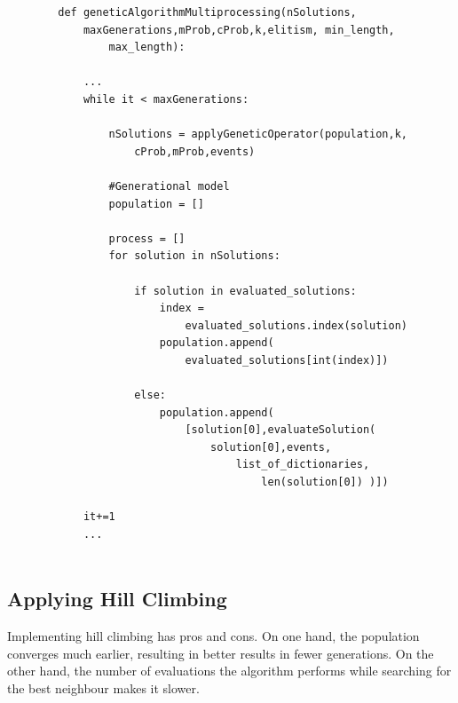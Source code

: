 \documentclass{article}
\begin{document}
        \begin{lstlisting}
        def geneticAlgorithmMultiprocessing(nSolutions,
            maxGenerations,mProb,cProb,k,elitism, min_length, 
                max_length):
    
            ...
            while it < maxGenerations:
    
                nSolutions = applyGeneticOperator(population,k,
                    cProb,mProb,events)
    
                #Generational model
                population = []
    
                process = []
                for solution in nSolutions:
                
                    if solution in evaluated_solutions:
                        index = 
                            evaluated_solutions.index(solution)
                        population.append(
                            evaluated_solutions[int(index)])
                    
                    else:
                        population.append(
                            [solution[0],evaluateSolution(
                                solution[0],events,
                                    list_of_dictionaries,
                                        len(solution[0]) )])
    
            it+=1
            ...
            
        \end{lstlisting}

    \subsection{Applying Hill Climbing}

    Implementing hill climbing has pros and cons.
    On one hand, the population converges much earlier, resulting in better results in fewer generations.
    On the other hand, the number of evaluations the algorithm performs while searching for the best neighbour makes it slower.
\end{document}
